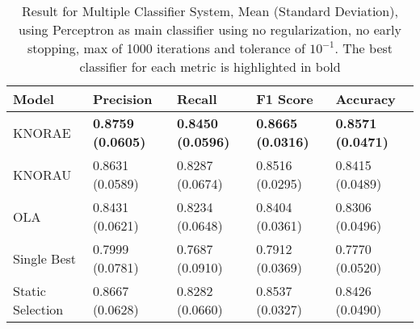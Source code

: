 \begin{table}[h!]
    \centering
    \renewcommand{\arraystretch}{1.8}
    \begin{tabular}{ p{3cm}p{2.8cm}p{2.8cm}p{2.8cm}p{2.8cm} }
        \toprule
        Model & Precision & Recall & F1 Score & Accuracy \\
        \midrule
        KNORAE & \textbf{0.8759 (0.0605)} & \textbf{0.8450 (0.0596)} & \textbf{0.8665 (0.0316)} & \textbf{0.8571 (0.0471)} \\
        KNORAU & 0.8631 (0.0589) & 0.8287 (0.0674) & 0.8516 (0.0295) & 0.8415 (0.0489) \\
        OLA & 0.8431 (0.0621) & 0.8234 (0.0648) & 0.8404 (0.0361) & 0.8306 (0.0496) \\
        Single Best & 0.7999 (0.0781) & 0.7687 (0.0910) & 0.7912 (0.0369) & 0.7770 (0.0520) \\
        Static Selection & 0.8667 (0.0628) & 0.8282 (0.0660) & 0.8537 (0.0327) & 0.8426 (0.0490) \\ [1ex]
        \bottomrule
        \end{tabular}
        \caption{%
        Result for Multiple Classifier System, Mean (Standard Deviation), using Perceptron as main classifier using no regularization, no early stopping, max of 1000 iterations and tolerance of $10^{-1}$. The best classifier for each metric is highlighted in bold%
        }\label{mcs_perceptron_table}
\end{table}